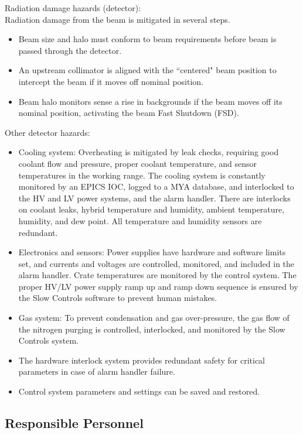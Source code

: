 Radiation damage hazards (detector):\\

Radiation damage from the beam is mitigated in several steps. 
\begin{itemize}
\item Beam size and halo must conform to beam requirements before beam is passed through the 
detector. 
\item An upstream collimator is aligned with the ``centered" beam position to intercept the 
beam if it moves off nominal position. 
\item Beam halo monitors sense a rise in backgrounds if the beam moves off its nominal position, 
activating the beam Fast Shutdown (FSD). 
\end{itemize}

Other detector hazards:
\begin{itemize}
\item Cooling system: Overheating is mitigated by leak checks, requiring good coolant flow and 
pressure, proper coolant temperature, and sensor temperatures in the working range. The cooling 
system is constantly monitored by an EPICS IOC, logged to a MYA database, and interlocked to 
the HV and LV power systems, and the alarm handler. There are interlocks on coolant leaks, 
hybrid temperature and humidity, ambient temperature, humidity, and dew point. All temperature 
and humidity sensors are redundant.
\item Electronics and sensors: Power supplies have hardware and software limits set, and currents 
and voltages are controlled, monitored, and included in the alarm handler. Crate temperatures 
are monitored by the control system. The proper HV/LV power supply ramp up and ramp down sequence 
is ensured by the Slow Controls software to prevent human mistakes. 
\item Gas system: To prevent condensation and gas over-pressure, the gas flow of the nitrogen 
purging is controlled, interlocked, and monitored by the Slow Controls system. 
\item The hardware interlock system provides redundant safety for critical parameters in case of 
alarm handler failure. 
\item Control system parameters and settings can be saved and restored.
\end{itemize}

\vfil
\eject

\subsection{Responsible Personnel}

